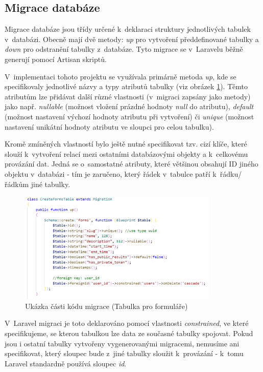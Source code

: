 	\subsection{Migrace databáze}
	Migrace databáze jsou třídy určené k~deklaraci struktury jednotlivých tabulek v~databázi. Obecně mají dvě metody: \textit{up} pro vytvoření předdefinované tabulky a \textit{down} pro odstranění tabulky z~databáze. Tyto migrace se v~Laravelu běžně generují pomocí Artisan skriptů.~\cite{LaravelMigrace}
	
	V~implementaci tohoto projektu se využívala primárně metoda \textit{up}, kde se specifikovaly jednotlivé názvy a typy atributů tabulky (viz obrázek \ref{fig:migrace}). Těmto atributům lze přidávat další různé vlastnosti (v~migraci zapsány jako metody) jako např. \textit{nullable} (možnost vložení prázdné hodnoty \textit{null} do atributu), \textit{default} (možnost nastavení výchozí hodnoty atributu při vytvoření) či \textit{unique} (možnost nastavení unikátní hodnoty atributu ve sloupci pro celou tabulku).
	
	Kromě zmíněných vlastností bylo ještě nutné specifikovat tzv. cizí klíče, které slouží k~vytvoření relací mezi ostatními databázovými objekty a k~celkovému provázání dat. Jedná se o~samostatné atributy, které většinou obsahují ID jiného objektu v~databázi - tím je zaručeno, který řádek v~tabulce patří k~řádku/řádkům jiné tabulky. 
	
	 \begin{figure}[h]
		\centering
		\includegraphics[width=0.85\textwidth]{img/migrace.png}
		\caption{Ukázka části kódu migrace (Tabulka pro formuláře)}
		\label{fig:migrace}
	\end{figure}
	
	V~Laravel migraci je toto deklarováno pomocí vlastnosti \textit{constrained}, ve které specifikujeme, se kterou tabulkou lze data ze současné tabulky spojovat. Pokud jsou i ostatní tabulky vytvořeny vygenerovanými migracemi, nemusíme ani specifikovat, který sloupec bude z~jiné tabulky sloužit k~provázání - k~tomu Laravel standardně používá sloupec \textit{id}.
	
